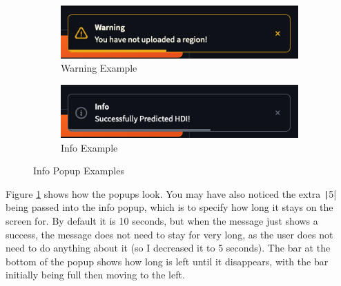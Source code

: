 \documentclass[12pt]{report}
\newcommand{\pil}[1]{\protect\texttt|#1|}
\begin{document}
\begin{figure}[H]
\centering
\begin{subfigure}{.8\textwidth}
    \centering
    \includegraphics[width=.9\linewidth]{ss22.6a.png}
    \caption{Warning Example}
\end{subfigure}
\begin{subfigure}{.8\textwidth}
    \centering
    \includegraphics[width=.9\linewidth]{ss22.6b.png}
    \caption{Info Example}
\end{subfigure}
\caption{Info Popup Examples}\label{fig:popupExamples}
\end{figure}

Figure \ref{fig:popupExamples} shows how the popups look. You may have also noticed the extra \pil{5} being passed into the info popup, which is to specify how long it stays on the screen for. By default it is 10 seconds, but when the message just shows a success, the message does not need to stay for very long, as the user does not need to do anything about it (so I decreased it to 5 seconds). The bar at the bottom of the popup shows how long is left until it disappears, with the bar initially being full then moving to the left.

\begin{center}
\end{center}
\end{document}
